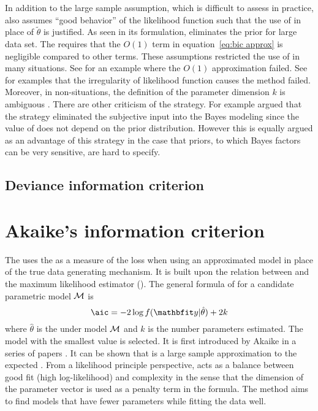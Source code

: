 In addition to the large sample assumption, which is difficult to assess in
practice, \bic also assumes ``good behavior'' of the likelihood function such
that the use of \mle in place of $\tilde\theta$ is justified. As seen in its
formulation, \bic eliminates the prior for large data set.  The \bic requires
that the $O(1)$ term in equation~\eqref{eq:bic approx} is negligible compared
to other terms. These assumptions restricted the use of \bic in many
situations.  See \cite{Gelfand:1994ux} for an example where the $O(1)$
approximation failed. See \cite{Berger:2001uy} for examples that the
irregularity of likelihood function causes the \bic method failed. Moreover,
in non-\iid situations, the definition of the parameter dimension $k$ is
ambiguous \cite{Spiegelhalter:1998uc, Kass:1995vb}. There are other criticism
of the \bic strategy.  For example \cite[][sec.~7.2.3]{Robert:2007tc} argued
that the \bic strategy eliminated the subjective input into the Bayes modeling
since the value of \bic does not depend on the prior distribution. However
this is equally argued as an advantage of this strategy in the case that
priors, to which Bayes factors can be very sensitive, are hard to specify.

\subsection{Deviance information criterion}
\label{sub:Deviance information criterion}

\section{Akaike's information criterion}
\label{sec:Akaike's information criterion}

The \aic uses the \kl \cite{Kullback:1951va} as a measure of the loss when
using an approximated model in place of the true data generating mechanism. It
is built upon the relation between \kl and the maximum likelihood estimator
(\mle). The general formula of \aic for a candidate parametric model $\mathcal{M}$
is
\begin{equation}
  \text{\aic} = -2\log f(\data|\hat\theta) + 2k
\end{equation}
where $\hat\theta$ is the \mle under model $\mathcal{M}$ and $k$ is the number
parameters estimated. The model with the smallest \aic value is selected.  It
is first introduced by Akaike in a series of papers \cite{Akaike:1973uc,
  Akaike:1974ih, Akaike:1977ul}. It can be shown that \aic is a large sample
approximation to the expected \kl \cite{Akaike:1973uc,Bozdogan:1987wy}. From a
likelihood principle perspective, \aic acts as a balance between good fit
(high log-likelihood) and complexity in the sense that the dimension of the
parameter vector is used as a penalty term in the formula. The \aic method
aims to find models that have fewer parameters while fitting the data well.

